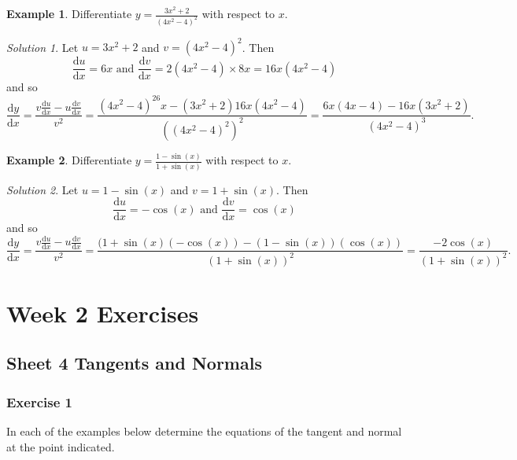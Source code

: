 \documentclass[
  11pt,
  oneside]{book}
\newcommand{\slide}{}
\theoremstyle{definition}
\theoremstyle{definition}
\newtheorem{example}{Example}[chapter]
\theoremstyle{definition}
\theoremstyle{definition}
\theoremstyle{remark}
\newtheorem*{solution}{Solution}
\begin{document}
\begin{example}
Differentiate \(y=\frac{3x^2+2}{(4x^2-4)^2}\) with respect to \(x\).
\end{example}

\begin{solution}
Let \(u = 3x^2+2\) and \(v = (4x^2-4)^2\).
Then
\[
\frac{\mathrm{d} u}{\mathrm{d} x} = 6x\text{ and }\frac{\mathrm{d} v}{\mathrm{d} x} = 2(4x^2-4)\times8x = 16x(4x^2-4)
\]
and so
\[
\frac{\mathrm{d} y}{\mathrm{d} x} = \frac{v\frac{\mathrm{d} u}{\mathrm{d} x}-u\frac{\mathrm{d} v}{\mathrm{d} x}}{v^2} = \frac{(4x^2-4)^26x - (3x^2+2)16x(4x^2-4)}{((4x^2-4)^2)^2} = \frac{6x(4x-4)-16x(3x^2+2)}{(4x^2-4)^3}.
\]
\end{solution}

\slide

\begin{example}
Differentiate \(y=\frac{1-\sin(x)}{1+\sin(x)}\) with respect to \(x\).
\end{example}

\begin{solution}
Let \(u = 1-\sin(x)\) and \(v = 1+\sin(x)\).
Then
\[
\frac{\mathrm{d} u}{\mathrm{d} x} = -\cos(x)\text{ and }\frac{\mathrm{d} v}{\mathrm{d} x} = \cos(x) 
\]
and so
\[
\frac{\mathrm{d} y}{\mathrm{d} x} = \frac{v\frac{\mathrm{d} u}{\mathrm{d} x}-u\frac{\mathrm{d} v}{\mathrm{d} x}}{v^2} = \frac{(1+\sin(x)(-\cos(x))-(1-\sin(x))(\cos(x))}{(1+\sin(x))^2} = \frac{-2\cos(x)}{(1+\sin(x))^2}.
\]
\end{solution}

\chapter*{Week 2 Exercises}\label{week-2-exercises}

\section{Sheet 4 Tangents and Normals}\label{sheet-4-tangents-and-normals}

\subsection*{Exercise 1}\label{exercise-1-1}

In each of the examples below determine the equations of the tangent and normal at the point indicated.
\end{document}

